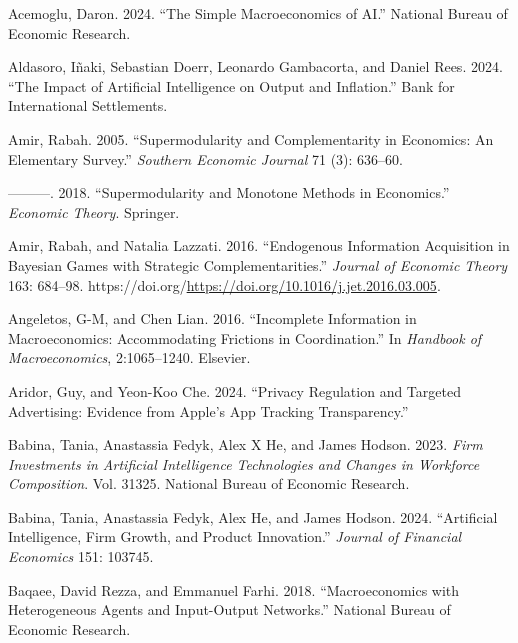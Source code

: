 \documentclass[
]{article}
\newlength{\cslhangindent}
\newenvironment{CSLReferences}[2] %
 {\begin{list}{}{%
  \setlength{\itemindent}{0pt}
  \setlength{\leftmargin}{0pt}
  \setlength{\parsep}{0pt}
  \ifodd #1
   \setlength{\leftmargin}{\cslhangindent}
   \setlength{\itemindent}{-1\cslhangindent}
  \fi
  \setlength{\itemsep}{#2\baselineskip}}}
 {\end{list}}
\theoremstyle{plain}
\theoremstyle{definition}
\theoremstyle{remark}
\begin{document}
\label{refs}
\begin{CSLReferences}{1}{0}
Acemoglu, Daron. 2024. {``The Simple Macroeconomics of AI.''} National
Bureau of Economic Research.

Aldasoro, Iñaki, Sebastian Doerr, Leonardo Gambacorta, and Daniel Rees.
2024. {``The Impact of Artificial Intelligence on Output and
Inflation.''} Bank for International Settlements.

Amir, Rabah. 2005. {``Supermodularity and Complementarity in Economics:
An Elementary Survey.''} \emph{Southern Economic Journal} 71 (3):
636--60.

---------. 2018. {``Supermodularity and Monotone Methods in
Economics.''} \emph{Economic Theory}. Springer.

Amir, Rabah, and Natalia Lazzati. 2016. {``Endogenous Information
Acquisition in Bayesian Games with Strategic Complementarities.''}
\emph{Journal of Economic Theory} 163: 684--98.
https://doi.org/\url{https://doi.org/10.1016/j.jet.2016.03.005}.

Angeletos, G-M, and Chen Lian. 2016. {``Incomplete Information in
Macroeconomics: Accommodating Frictions in Coordination.''} In
\emph{Handbook of Macroeconomics}, 2:1065--1240. Elsevier.

Aridor, Guy, and Yeon-Koo Che. 2024. {``Privacy Regulation and Targeted
Advertising: Evidence from Apple's App Tracking Transparency.''}

Babina, Tania, Anastassia Fedyk, Alex X He, and James Hodson. 2023.
\emph{Firm Investments in Artificial Intelligence Technologies and
Changes in Workforce Composition}. Vol. 31325. National Bureau of
Economic Research.

Babina, Tania, Anastassia Fedyk, Alex He, and James Hodson. 2024.
{``Artificial Intelligence, Firm Growth, and Product Innovation.''}
\emph{Journal of Financial Economics} 151: 103745.

Baqaee, David Rezza, and Emmanuel Farhi. 2018. {``Macroeconomics with
Heterogeneous Agents and Input-Output Networks.''} National Bureau of
Economic Research.


\end{CSLReferences}
\end{document}
